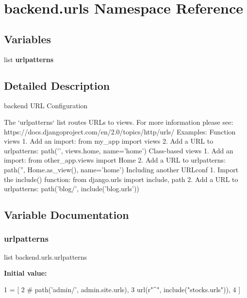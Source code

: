 \hypertarget{namespacebackend_1_1urls}{}\section{backend.\+urls Namespace Reference}
\label{namespacebackend_1_1urls}
\subsection*{Variables}
\begin{DoxyCompactItemize}
\item 
list {\bfseries urlpatterns}
\end{DoxyCompactItemize}


\subsection{Detailed Description}
\begin{DoxyVerb}backend URL Configuration

The `urlpatterns` list routes URLs to views. For more information please see:
https://docs.djangoproject.com/en/2.0/topics/http/urls/
Examples:
Function views
1. Add an import:  from my_app import views
2. Add a URL to urlpatterns:  path('', views.home, name='home')
Class-based views
1. Add an import:  from other_app.views import Home
2. Add a URL to urlpatterns:  path('', Home.as_view(), name='home')
Including another URLconf
1. Import the include() function: from django.urls import include, path
2. Add a URL to urlpatterns:  path('blog/', include('blog.urls'))
\end{DoxyVerb}
 

\subsection{Variable Documentation}
\mbox{\label{namespacebackend_1_1urls_acd5289136b849114d0d146559249a2b9}} 
\subsubsection{\texorpdfstring{urlpatterns}{urlpatterns}}
{\footnotesize\ttfamily list backend.\+urls.\+urlpatterns}

{\bfseries Initial value\+:}
\begin{DoxyCode}
1 =  [
2     \textcolor{comment}{# path('admin/', admin.site.urls),}
3     url(\textcolor{stringliteral}{r"^"}, include(\textcolor{stringliteral}{"stocks.urls"})),
4 ]
\end{DoxyCode}
